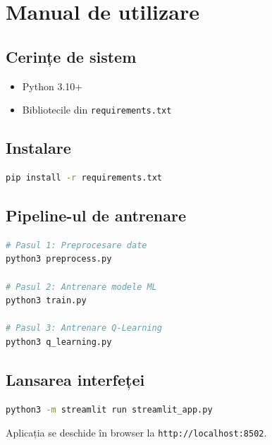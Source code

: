 \documentclass[12pt,a4paper]{article}
\begin{document}
\section{Manual de utilizare}

\subsection{Cerințe de sistem}

\begin{itemize}
    \item Python 3.10+
    \item Bibliotecile din \texttt{requirements.txt}
\end{itemize}

\subsection{Instalare}

\begin{lstlisting}[language=bash, caption={Instalarea dependintelor}]
pip install -r requirements.txt
\end{lstlisting}

\subsection{Pipeline-ul de antrenare}

\begin{lstlisting}[language=bash, caption={Rularea pipeline-ului}]
# Pasul 1: Preprocesare date
python3 preprocess.py

# Pasul 2: Antrenare modele ML
python3 train.py

# Pasul 3: Antrenare Q-Learning
python3 q_learning.py
\end{lstlisting}

\subsection{Lansarea interfeței}

\begin{lstlisting}[language=bash, caption={Lansarea aplicatiei}]
python3 -m streamlit run streamlit_app.py
\end{lstlisting}

Aplicația se deschide în browser la \texttt{http://localhost:8502}.
\end{document}
